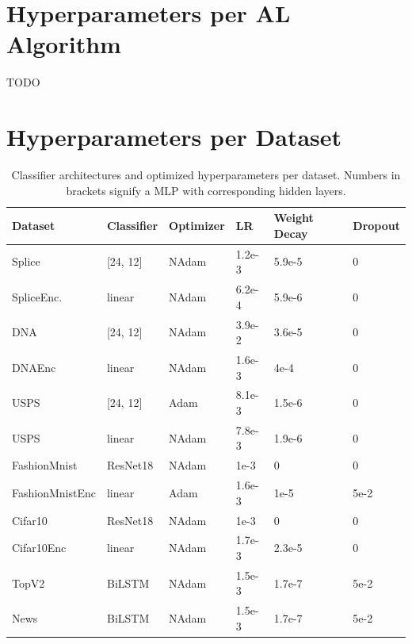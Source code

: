 \documentclass[]{article}
\begin{document}
\section{Hyperparameters per AL Algorithm}\label{app:agent_hyperparameters}
\begin{table}[H]
	TODO
\end{table}

\section{Hyperparameters per Dataset}\label{app:hyperparameters}
\begin{table}[H]
	\centering
	\begin{tabular}{l || l | l l l l}
		Dataset & Classifier & Optimizer & LR & Weight Decay & Dropout \\
		\hline
		Splice & [24, 12] & NAdam & 1.2e-3 & 5.9e-5 & 0 \\
		SpliceEnc. & linear & NAdam & 6.2e-4 & 5.9e-6 & 0 \\
		DNA & [24, 12] & NAdam & 3.9e-2 & 3.6e-5 & 0 \\
		DNAEnc & linear & NAdam & 1.6e-3 & 4e-4 & 0 \\
		USPS & [24, 12] & Adam & 8.1e-3 & 1.5e-6 & 0 \\
		USPS & linear & NAdam & 7.8e-3 & 1.9e-6 & 0 \\
		FashionMnist & ResNet18 & NAdam & 1e-3 & 0 & 0 \\
		FashionMnistEnc & linear & Adam & 1.6e-3 & 1e-5 & 5e-2 \\
		Cifar10 & ResNet18 & NAdam & 1e-3 & 0 & 0 \\
		Cifar10Enc & linear & NAdam & 1.7e-3 & 2.3e-5 & 0 \\
		TopV2 & BiLSTM & NAdam & 1.5e-3 & 1.7e-7 & 5e-2 \\
		News & BiLSTM & NAdam & 1.5e-3 & 1.7e-7 & 5e-2 \\
	\end{tabular}
	\caption{Classifier architectures and optimized hyperparameters per dataset. Numbers in brackets signify a MLP with corresponding hidden layers.}
	\label{tab:architectures}
\end{table}
\end{document}
